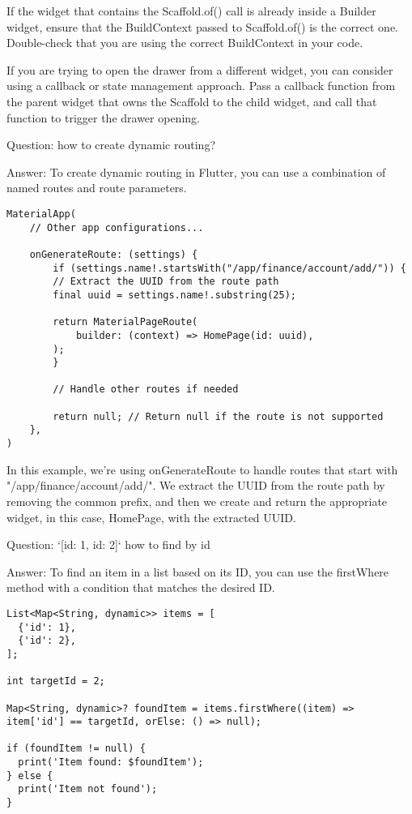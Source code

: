 If the widget that contains the Scaffold.of() call is already inside a Builder widget, ensure that the BuildContext 
passed to Scaffold.of() is the correct one. Double-check that you are using the correct BuildContext in your code.

If you are trying to open the drawer from a different widget, you can consider using a callback or state management 
approach. Pass a callback function from the parent widget that owns the Scaffold to the child widget, and call that 
function to trigger the drawer opening.


Question: how to create dynamic routing?

Answer: To create dynamic routing in Flutter, you can use a combination of named routes and route parameters. 

\begin{lstlisting}
MaterialApp(
    // Other app configurations...
    
    onGenerateRoute: (settings) {
        if (settings.name!.startsWith("/app/finance/account/add/")) {
        // Extract the UUID from the route path
        final uuid = settings.name!.substring(25);
    
        return MaterialPageRoute(
            builder: (context) => HomePage(id: uuid),
        );
        }
    
        // Handle other routes if needed
    
        return null; // Return null if the route is not supported
    },
)     
\end{lstlisting}

In this example, we're using onGenerateRoute to handle routes that start with "/app/finance/account/add/". 
We extract the UUID from the route path by removing the common prefix, and then we create and return the 
appropriate widget, in this case, HomePage, with the extracted UUID.

Question: `[{id: 1}, {id: 2}]` how to find by id

Answer: To find an item in a list based on its ID, you can use the firstWhere method with a condition that 
matches the desired ID. 

\begin{lstlisting}
List<Map<String, dynamic>> items = [
  {'id': 1},
  {'id': 2},
];

int targetId = 2;

Map<String, dynamic>? foundItem = items.firstWhere((item) => item['id'] == targetId, orElse: () => null);

if (foundItem != null) {
  print('Item found: $foundItem');
} else {
  print('Item not found');
}
\end{lstlisting}

